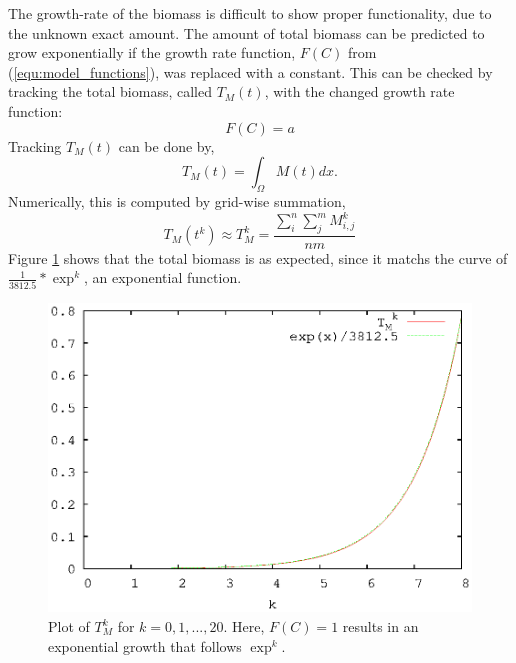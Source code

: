   The growth-rate of the biomass is difficult to show proper functionality, due to the unknown exact amount.
  The amount of total biomass can be predicted to grow exponentially if the growth rate function, $F(C)$ from (\ref{equ:model_functions}), was replaced with a constant.
  This can be checked by tracking the total biomass, called $T_{M}(t)$, with the changed growth rate function:
  \begin{equation} \label{equ:F_constant}
    F(C) = a
  \end{equation}
  Tracking $T_{M}(t)$ can be done by,
  \begin{equation} \label{equ:total_biomass}
    T_{M}(t) = \int_{\Omega} M(t) dx.
  \end{equation}
  Numerically, this is computed by  grid-wise summation,
  \begin{equation}
    T_{M}(t^k) \approx T_{M}^{k} = \frac{ \sum^n_i \sum^m_j M^{k}_{i,j} }{nm}
  \end{equation}
  Figure \ref{fig:basic_growth} shows that the total biomass is as expected, since it matchs the curve of $\frac{1}{3812.5}*\exp^{k}$, an exponential function.

  \begin{figure}
    \centering
    \includegraphics[scale = 0.9]{basic_growth}
    \caption{Plot of $T_{M}^{k}$ for $k = 0,1,...,20$. Here, $F(C) = 1$ results in an exponential growth that follows $\exp^k$.}
    \label{fig:basic_growth}
  \end{figure}
  

